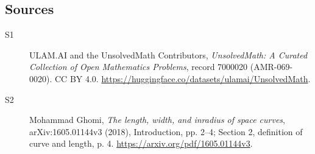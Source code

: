 \documentclass[11pt]{article}
\begin{document}
\subsection{Sources}
\begin{description}
\item[\hypertarget{source:7000020:1}{S1}] ULAM.AI and the UnsolvedMath Contributors, \emph{UnsolvedMath: A Curated Collection of Open Mathematics Problems}, record 7000020 (AMR-069-0020). CC BY 4.0. \url{https://huggingface.co/datasets/ulamai/UnsolvedMath}.
\item[\hypertarget{source:7000020:2}{S2}] Mohammad Ghomi, \emph{The length, width, and inradius of space curves}, arXiv:1605.01144v3 (2018), Introduction, pp. 2--4; Section 2, definition of curve and length, p. 4. \url{https://arxiv.org/pdf/1605.01144v3}.
\end{description}
\label{end:7000020}
\end{document}
